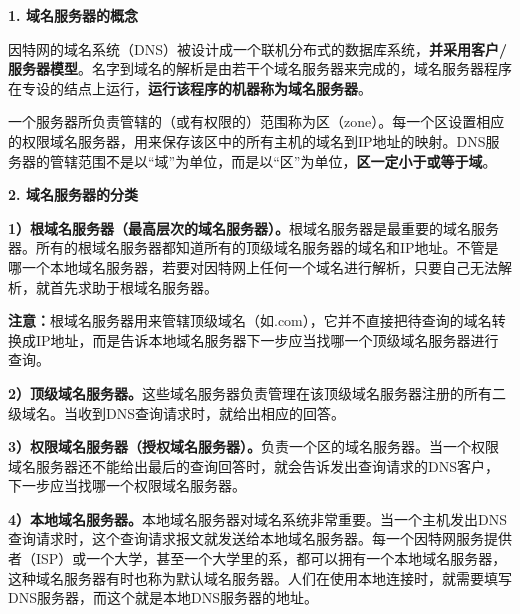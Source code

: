 \textbf{{1. 域名服务器的概念}}

{{因特}{网的域名系统（DNS）}}被设计成一个联机分布式的数据库系统，\textbf{{并采用客户/服务器模型}}。名字到域名的解析是由若干个域名服务器来完成的，域名服务器程序在专设的结点上运行，\textbf{运行该程序的机器称为域名服务器}。

一个服务器所负责管辖的（或有权限的）范围称为区（zone）。每一个区设置相应的权限域名服务器，用来保存该区中的所有主机的域名到IP地址的映射。DNS服务器的管辖范围不是以``域''为单位，而是以``区''为单位，{\textbf{区一定小于或等于域}}。

\textbf{{2. 域名服务器的分类}}

\textbf{{1）根域名服务器}（最高层次的域名服务器）。}根域名服务器是最重要的域名服务器。所有的根域名服务器都知道所有的顶级域名服务器的域名和IP地址。不管是哪一个本地域名服务器，若要对因特网上任何一个域名进行解析，只要自己无法解析，就首先求助于根域名服务器。

{\textbf{注意：}{根域名服务器用来管辖顶级域名（如.com），它并不直接把待查询的域名转换成IP地址，而是告诉本地域名服务器下一步应当找哪一个顶级域名服务器进行查询。}}

\textbf{{2）顶级域名服务器}。}这些域名服务器负责管理在该顶级域名服务器注册的所有二级域名。当收到DNS查询请求时，就给出相应的回答。

\textbf{{3）权限域名服务器}（授权域名服务器）。}负责一个区的域名服务器。当一个权限域名服务器还不能给出最后的查询回答时，就会告诉发出查询请求的DNS客户，下一步应当找哪一个权限域名服务器。

\textbf{{4）本地域名服务器}。}本地域名服务器对域名系统非常重要。当一个主机发出DNS查询请求时，这个查询请求报文就发送给本地域名服务器。每一个因特网服务提供者（ISP）或一个大学，甚至一个大学里的系，都可以拥有一个本地域名服务器，这种域名服务器有时也称为默认域名服务器。人们在使用本地连接时，就需要填写DNS服务器，而这个就是本地DNS服务器的地址。

